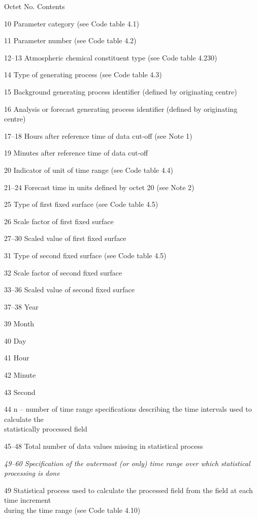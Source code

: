Octet No. Contents

10 Parameter category (see Code table 4.1)

11 Parameter number (see Code table 4.2)

12--13 Atmospheric chemical constituent type (see Code table 4.230)

14 Type of generating process (see Code table 4.3)

15 Background generating process identifier (defined by originating centre)

16 Analysis or forecast generating process identifier (defined by originating centre)

17--18 Hours after reference time of data cut-off (see Note 1)

19 Minutes after reference time of data cut-off

20 Indicator of unit of time range (see Code table 4.4)

21--24 Forecast time in units defined by octet 20 (see Note 2)

25 Type of first fixed surface (see Code table 4.5)

26 Scale factor of first fixed surface

27--30 Scaled value of first fixed surface

31 Type of second fixed surface (see Code table 4.5)

32 Scale factor of second fixed surface

33--36 Scaled value of second fixed surface

37--38 Year

39 Month

40 Day

41 Hour

42 Minute

43 Second

44 n -- number of time range specifications describing the time intervals used to calculate the\\
statistically processed field

45--48 Total number of data values missing in statistical process

\emph{49--60 Specification of the outermost (or only) time range over which statistical}\\
\emph{processing is done}

49 Statistical process used to calculate the processed field from the field at each time increment\\
during the time range (see Code table 4.10)


